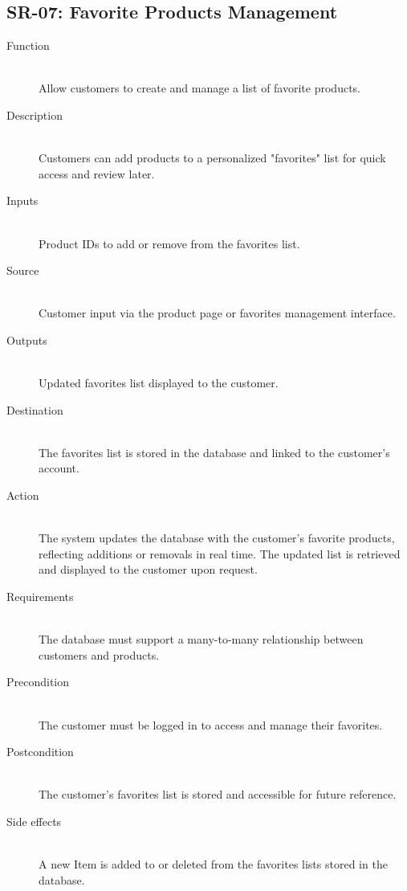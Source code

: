 \documentclass[twoside,a4paper,journal]{IEEEtran}
\begin{document}
\subsection{SR-07: Favorite Products Management}
\begin{description}
  \item[Function] \hfill \\
  Allow customers to
  create and manage a list of favorite products.
  \item[Description] \hfill \\
  Customers can add products to a personalized
  "favorites" list for quick access and review later.
  \item[Inputs] \hfill \\
  Product IDs to add or remove from the favorites list.
  \item[Source] \hfill \\
  Customer input via the product page or favorites
  management interface.
  \item[Outputs] \hfill \\
  Updated favorites list displayed to the customer.
  \item[Destination] \hfill \\
  The favorites list is stored in the database and
  linked to the customer's account.
  \item[Action] \hfill \\
  The system updates the database with the customer's
  favorite products, reflecting additions or removals in real time. The updated
  list is retrieved and displayed to the customer upon request.
  \item[Requirements] \hfill \\
  The database must support a many-to-many relationship
  between customers and products.
  \item[Precondition] \hfill \\
  The customer must be logged in to access and manage
  their favorites.
  \item[Postcondition] \hfill \\
  The customer's favorites list is stored and
  accessible for future reference.
  \item[Side effects] \hfill \\
  A new Item is added to or deleted from the favorites
  lists stored in the database.
\end{description}
\end{document}

